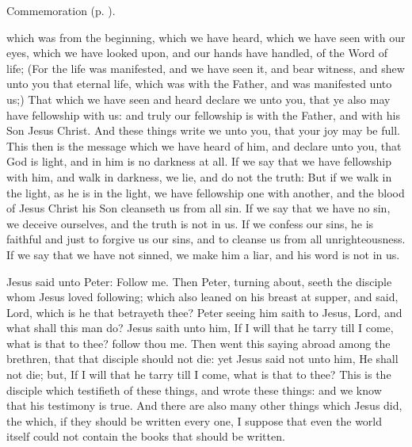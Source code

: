 \begin{rubric}
    Commemoration  (p. \pageref{NativityMassIIICollect}).
\end{rubric}

 which was from the beginning, which we have heard, which we have seen with our eyes, which we have looked upon, and our hands have handled, of the Word of life; (For the life was manifested, and we have seen it, and bear witness, and shew unto you that eternal life, which was with the Father, and was manifested unto us;) That which we have seen and heard declare we unto you, that ye also may have fellowship with us: and truly our fellowship is with the Father, and with his Son Jesus Christ. And these things write we unto you, that your joy may be full. This then is the message which we have heard of him, and declare unto you, that God is light, and in him is no darkness at all. If we say that we have fellowship with him, and walk in darkness, we lie, and do not the truth: But if we walk in the light, as he is in the light, we have fellowship one with another, and the blood of Jesus Christ his Son cleanseth us from all sin. If we say that we have no sin, we deceive ourselves, and the truth is not in us. If we confess our sins, he is faithful and just to forgive us our sins, and to cleanse us from all unrighteousness. If we say that we have not sinned, we make him a liar, and his word is not in us.


 Jesus said unto Peter: Follow me. Then Peter, turning about, seeth the disciple whom Jesus loved following; which also leaned on his breast at supper, and said, Lord, which is he that betrayeth thee? Peter seeing him saith to Jesus, Lord, and what shall this man do? Jesus saith unto him, If I will that he tarry till I come, what is that to thee? follow thou me. Then went this saying abroad among the brethren, that that disciple should not die: yet Jesus said not unto him, He shall not die; but, If I will that he tarry till I come, what is that to thee? This is the disciple which testifieth of these things, and wrote these things: and we know that his testimony is true. And there are also many other things which Jesus did, the which, if they should be written every one, I suppose that even the world itself could not contain the books that should be written.

